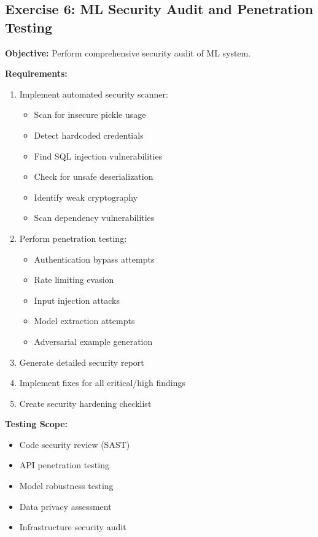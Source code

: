 \subsection{Exercise 6: ML Security Audit and Penetration Testing}

\textbf{Objective:} Perform comprehensive security audit of ML system.

\textbf{Requirements:}
\begin{enumerate}
    \item Implement automated security scanner:
    \begin{itemize}
        \item Scan for insecure pickle usage
        \item Detect hardcoded credentials
        \item Find SQL injection vulnerabilities
        \item Check for unsafe deserialization
        \item Identify weak cryptography
        \item Scan dependency vulnerabilities
    \end{itemize}
    \item Perform penetration testing:
    \begin{itemize}
        \item Authentication bypass attempts
        \item Rate limiting evasion
        \item Input injection attacks
        \item Model extraction attempts
        \item Adversarial example generation
    \end{itemize}
    \item Generate detailed security report
    \item Implement fixes for all critical/high findings
    \item Create security hardening checklist
\end{enumerate}

\textbf{Testing Scope:}
\begin{itemize}
    \item Code security review (SAST)
    \item API penetration testing
    \item Model robustness testing
    \item Data privacy assessment
    \item Infrastructure security audit
\end{itemize}

